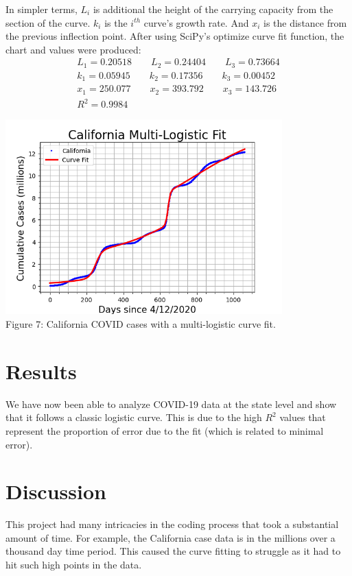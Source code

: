 \documentclass[12pt]{article}
\begin{document}
\noindent In simpler terms, $L_{i}$ is additional the height of the carrying capacity from the section of the curve. $k_{i}$ is the $i^{th}$ curve's growth rate. And $x_{i}$ is the distance from the previous inflection point. After using SciPy's optimize curve fit function, the chart and values were produced: \\
\[
\begin{array}{c}
     L_{1}=0.20518 \qquad L_{2}=0.24404 \qquad L_{3}=0.73664 \\
     k_{1}=0.05945 \qquad k_{2}=0.17356 \qquad k_{3}=0.00452 \\
     x_{1}=250.077 \qquad x_{2}=393.792 \qquad x_{3}=143.726 \\
     R^{2}=0.9984
\end{array}
\]
\begin{center}
\includegraphics[width = 0.8\textwidth]{multi-logistic fit.png} \\
Figure 7: California COVID cases with a multi-logistic curve fit.
\end{center}

\pagebreak


\section{Results}
We have now been able to analyze COVID-19 data at the state level and show that it follows a classic logistic curve. This is due to the high $R^{2}$ values that represent the proportion of error due to the fit (which is related to minimal error). 

\section{Discussion}
This project had many intricacies in the coding process that took a substantial amount of time. For example, the California case data is in the millions over a thousand day time period. This caused the curve fitting to struggle as it had to hit such high points in the data. \\
\end{document}
